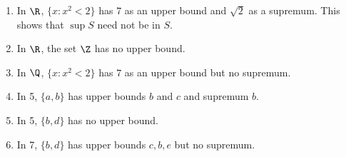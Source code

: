 \documentclass[a4paper]{article}
\begin{document}
\begin{eg}\leavevmode
  \begin{enumerate}
  \item In \(\R\), \(\{x: x^2 < 2\}\) has \(7\) as an upper bound and \(\sqrt 2\) as a supremum. This shows that \(\sup S\) need not be in \(S\).
  \item In \(\R\), the set \(\Z\) has no upper bound.
  \item In \(\Q\), \(\{x: x^2 < 2\}\) has \(7\) as an upper bound but no supremum.
  \item In 5, \(\{a, b\}\) has upper bounds \(b\) and \(c\) and supremum \(b\).
  \item In 5, \(\{b, d\}\) has no upper bound.
  \item In 7, \(\{b, d\}\) has upper bounds \(c, b, e\) but no supremum.
  \end{enumerate}
\end{eg}






\printindex

\iffalse
logic is the interplay of syntax and semantics
set: stuff with sets, universe of sets

Contents

1: Propositional logic
2: Well-ordering and ordinals
3: Posets and Zorn's Lemma
4: Predicate logic
5: Set theory
6: Cardinals

Reading:
Johnstone, Notes on logic and set theory
van Dalen, Logic and structure
Hainal & Hamburger, Set theory
Forster, Logic, induction and sets
\fi
\end{document}
